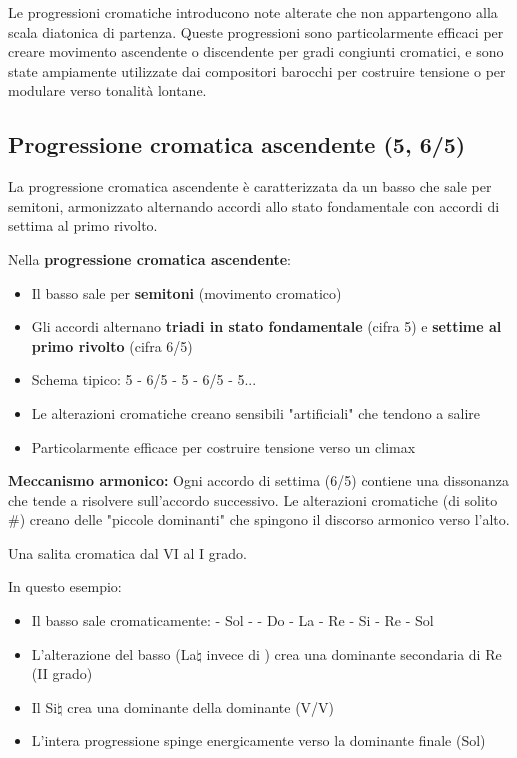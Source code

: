 Le progressioni cromatiche introducono note alterate che non appartengono alla scala diatonica di partenza. Queste progressioni sono particolarmente efficaci per creare movimento ascendente o discendente per gradi congiunti cromatici, e sono state ampiamente utilizzate dai compositori barocchi per costruire tensione o per modulare verso tonalità lontane.

\subsection{Progressione cromatica ascendente (5, 6/5)}
\label{subsec:progressione_cromatica_ascendente}

La progressione cromatica ascendente è caratterizzata da un basso che sale per semitoni, armonizzato alternando accordi allo stato fondamentale con accordi di settima al primo rivolto.

\begin{regola}
	\label{reg:progressione_cromatica_asc}
	Nella \textbf{progressione cromatica ascendente}:
	
	\begin{itemize}
		\item Il basso sale per \textbf{semitoni} (movimento cromatico)
		\item Gli accordi alternano \textbf{triadi in stato fondamentale} (cifra 5) e \textbf{settime al primo rivolto} (cifra 6/5)
		\item Schema tipico: 5 - 6/5 - 5 - 6/5 - 5...
		\item Le alterazioni cromatiche creano sensibili "artificiali" che tendono a salire
		\item Particolarmente efficace per costruire tensione verso un climax
	\end{itemize}
	
	\textbf{Meccanismo armonico:}
	Ogni accordo di settima (6/5) contiene una dissonanza che tende a risolvere sull'accordo successivo. Le alterazioni cromatiche (di solito \#) creano delle "piccole dominanti" che spingono il discorso armonico verso l'alto.
\end{regola}

\begin{esempio}
	\label{ex:progressione_cromatica_asc}
	Una salita cromatica dal VI al I grado.
	
	In questo esempio:
	\begin{itemize}
		\item Il basso sale cromaticamente: \Labemolle  - Sol - \Labemolle  - Do - La - Re - Si - Re - Sol
		\item L'alterazione del basso (La$\natural$ invece di \Labemolle ) crea una dominante secondaria di Re (II grado)
		\item Il Si$\natural$ crea una dominante della dominante (V/V)
		\item L'intera progressione spinge energicamente verso la dominante finale (Sol)
	\end{itemize}
\end{esempio}

